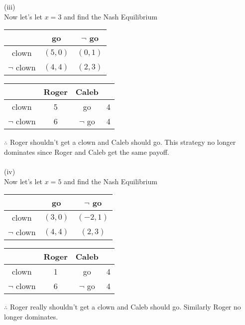 \documentclass[12pt,letter]{article}
\begin{document}
(iii)\\
Now let's let $x=3$ and find the Nash Equilibrium
\begin{figure*}[h!]
\centering
\begin{tabular}{|c|c|c|}
	\hline
	& go & $\neg$ go\\
	\hline
	clown & $(5,0)$ & $(0,1)$\\
	\hline
	$\neg$ clown & $(4,4)$ & $(2,3)$\\
	\hline
\end{tabular}
\end{figure*}
\begin{figure*}[h!]
\centering
\begin{tabular}{c c|c c}
	& Roger & Caleb\\
	\hline
	clown & 5 & go & 4\\
	$\neg$ clown & 6 & $\neg$ go & 4
\end{tabular}
\end{figure*}
\FloatBarrier
$\therefore$ Roger shouldn't get a clown and Caleb should go. This strategy
no longer dominates since Roger and Caleb get the same payoff. 
\\
\\
(iv)\\
Now let's let $x=5$ and find the Nash Equilibrium
\begin{figure*}[h!]
\centering
\begin{tabular}{|c|c|c|}
	\hline
	& go & $\neg$ go\\
	\hline
	clown & $(3,0)$ & $(-2,1)$\\
	\hline
	$\neg$ clown & $(4,4)$ & $(2,3)$\\
	\hline
\end{tabular}
\end{figure*}
\begin{figure*}[h!]
\centering
\begin{tabular}{c c|c c}
	& Roger & Caleb\\
	\hline
	clown & 1 & go & 4\\
	$\neg$ clown & 6 & $\neg$ go & 4
\end{tabular}
\end{figure*}
\FloatBarrier
$\therefore$ Roger really shouldn't get a clown and Caleb should go. Similarly
Roger no longer dominates.
\end{document}
